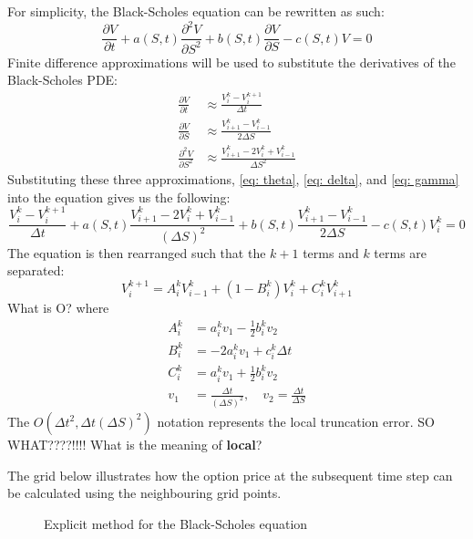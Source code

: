 For simplicity, the Black-Scholes equation can be rewritten as such:
\[
\frac{\partial V}{\partial t} + a(S,t) \frac{\partial^2 V}{\partial S^2} + b(S,t) \frac{\partial V}{\partial S} - c(S,t) V = 0
\]
Finite difference approximations will be used to substitute the derivatives of the Black-Scholes PDE:
\begin{align}
\frac{\partial V}{\partial t} &\approx \frac{V_i^k - V_i^{k+1}}{\Delta t} \tag{Theta} \label{eq: theta} \\
\frac{\partial V}{\partial S} &\approx \frac{V_{i+1}^k - V_{i-1}^k}{2 \Delta S} \tag{Delta} \label{eq: delta}\\
\frac{\partial^2 V}{\partial S^2} &\approx \frac{V_{i+1}^k - 2V_i^k + V_{i-1}^k}{\Delta S^2} \tag{Gamma}\label{eq: gamma}
\end{align}
Substituting these three approximations, \eqref{eq: theta}, \eqref{eq: delta}, and \eqref{eq: gamma} into the equation gives us the following:
\[
\frac{V_i^k - V_i^{k+1}}{\Delta t} + a(S,t) \frac{V_{i+1}^k - 2V_i^k + V_{i-1}^k}{(\Delta S)^2} + b(S,t) \frac{V_{i+1}^k - V_{i-1}^k}{2 \Delta S} - c(S,t) V_i^k = 0
\]
The equation is then rearranged such that the $k+1$ terms and $k$ terms are separated:
\[
V_i^{k+1} = A_i^k V_{i-1}^k + (1-B_i^k) V_i^k + C_i^k V_{i+1}^k
\]
{\color{red}What is O?}
where
\begin{align*}
    A_i^k &= a_i^k v_1 - \frac{1}{2} b_i^k v_2 \\
    B_i^k &= -2a_i^k v_1 + c_i^k \Delta t \\
    C_i^k &= a_i^k v_1 + \frac{1}{2} b_i^k v_2 \\
    v_1 &= \frac{\Delta t}{(\Delta S)^2}, \quad v_2 = \frac{\Delta t}{\Delta S}
\end{align*}
The $O(\Delta t^2, \Delta t (\Delta S)^2)$ notation represents the local truncation error.
{\color{red}SO WHAT????!!!! What is the meaning of \textbf{local}?}

The grid below illustrates how the option price at the subsequent time step can be calculated using the neighbouring grid points.


\begin{figure}[H]
    \centering
    \caption{Explicit method for the Black-Scholes equation}
    \label{fig:bse-explicit}
\end{figure}

